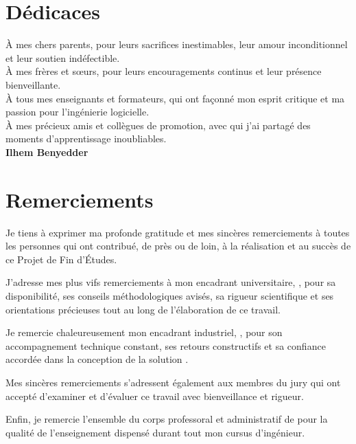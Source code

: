 
\chapter*{Dédicaces}

\begin{itshape}
\begin{center}
À mes chers parents, pour leurs sacrifices inestimables, leur amour inconditionnel et leur soutien indéfectible.\\
\vspace{0.8cm}
À mes frères et sœurs, pour leurs encouragements continus et leur présence bienveillante.\\
\vspace{0.8cm}
À tous mes enseignants et formateurs, qui ont façonné mon esprit critique et ma passion pour l'ingénierie logicielle.\\
\vspace{0.8cm}
À mes précieux amis et collègues de promotion, avec qui j'ai partagé des moments d'apprentissage inoubliables.\\
\vspace{1.2cm}
\textbf{Ilhem Benyedder}
\end{center}
\end{itshape}

\newpage

\chapter*{Remerciements}

\begin{flushleft}
Je tiens à exprimer ma profonde gratitude et mes sincères remerciements à toutes les personnes qui ont contribué, de près ou de loin, à la réalisation et au succès de ce Projet de Fin d'Études.

J'adresse mes plus vifs remerciements à mon encadrant universitaire, \textbf{\academicAdvisor}, pour sa disponibilité, ses conseils méthodologiques avisés, sa rigueur scientifique et ses orientations précieuses tout au long de l'élaboration de ce travail.

Je remercie chaleureusement mon encadrant industriel, \textbf{\industrialAdvisor}, pour son accompagnement technique constant, ses retours constructifs et sa confiance accordée dans la conception de la solution \projectShortTitle.

Mes sincères remerciements s'adressent également aux membres du jury qui ont accepté d'examiner et d'évaluer ce travail avec bienveillance et rigueur.

Enfin, je remercie l'ensemble du corps professoral et administratif de \textbf{\institution} pour la qualité de l'enseignement dispensé durant tout mon cursus d'ingénieur.
\end{flushleft}
